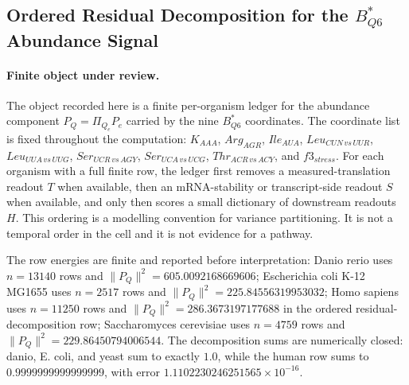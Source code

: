 
\subsection{Ordered Residual Decomposition for the $B^*_{Q6}$ Abundance Signal}
\label{sec:bioreality-q6-ordered-residual-decomposition}

\paragraph{Finite object under review.}
The object recorded here is a finite per-organism ledger for the abundance component $P_Q=\Pi_{Q_e}P_e$ carried by the nine $B^*_{Q6}$ coordinates.  The coordinate list is fixed throughout the computation:
$K_{AAA}$, $Arg_{AGR}$, $Ile_{AUA}$, $Leu_{CUN\,vs\,UUR}$, $Leu_{UUA\,vs\,UUG}$, $Ser_{UCR\,vs\,AGY}$, $Ser_{UCA\,vs\,UCG}$, $Thr_{ACR\,vs\,ACY}$, and $f3_{stress}$.  For each organism with a full finite row, the ledger first removes a measured-translation readout $T$ when available, then an mRNA-stability or transcript-side readout $S$ when available, and only then scores a small dictionary of downstream readouts $H$.  This ordering is a modelling convention for variance partitioning.  It is not a temporal order in the cell and it is not evidence for a pathway.

The row energies are finite and reported before interpretation: Danio rerio uses $n=13140$ rows and $\|P_Q\|^2=605.0092168669606$; Escherichia coli K-12 MG1655 uses $n=2517$ rows and $\|P_Q\|^2=225.84556319953032$; Homo sapiens uses $n=11250$ rows and $\|P_Q\|^2=286.3673197177688$ in the ordered residual-decomposition row; Saccharomyces cerevisiae uses $n=4759$ rows and $\|P_Q\|^2=229.86450794006544$.  The decomposition sums are numerically closed: danio, E. coli, and yeast sum to exactly $1.0$, while the human row sums to $0.9999999999999999$, with error $1.1102230246251565\times 10^{-16}$.

